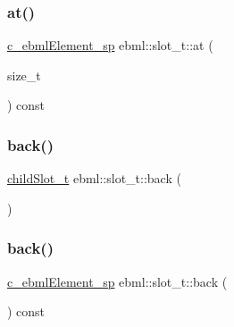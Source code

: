 \mbox{\label{classebml_1_1slot__t_acf1d704eae91fc410487421b80988f57}} 
\subsubsection{\texorpdfstring{at()}{at()}\hspace{0.1cm}{\footnotesize\ttfamily [2/2]}}
{\footnotesize\ttfamily \mbox{\hyperlink{namespaceebml_a2deef4e8071531b32e3533f1bf978917}{c\+\_\+ebml\+Element\+\_\+sp}} ebml\+::slot\+\_\+t\+::at (\begin{DoxyParamCaption}\item[{size\+\_\+t}]{ }\end{DoxyParamCaption}) const}

\mbox{\label{classebml_1_1slot__t_adc0fab024b3dd1a22e1ac27081ed1677}} 
\subsubsection{\texorpdfstring{back()}{back()}\hspace{0.1cm}{\footnotesize\ttfamily [1/2]}}
{\footnotesize\ttfamily \mbox{\hyperlink{classebml_1_1childSlot__t}{child\+Slot\+\_\+t}} ebml\+::slot\+\_\+t\+::back (\begin{DoxyParamCaption}{ }\end{DoxyParamCaption})}

\mbox{\label{classebml_1_1slot__t_ae9b2a7d37d5f8d71e97e973c9c708899}} 
\subsubsection{\texorpdfstring{back()}{back()}\hspace{0.1cm}{\footnotesize\ttfamily [2/2]}}
{\footnotesize\ttfamily \mbox{\hyperlink{namespaceebml_a2deef4e8071531b32e3533f1bf978917}{c\+\_\+ebml\+Element\+\_\+sp}} ebml\+::slot\+\_\+t\+::back (\begin{DoxyParamCaption}{ }\end{DoxyParamCaption}) const}

